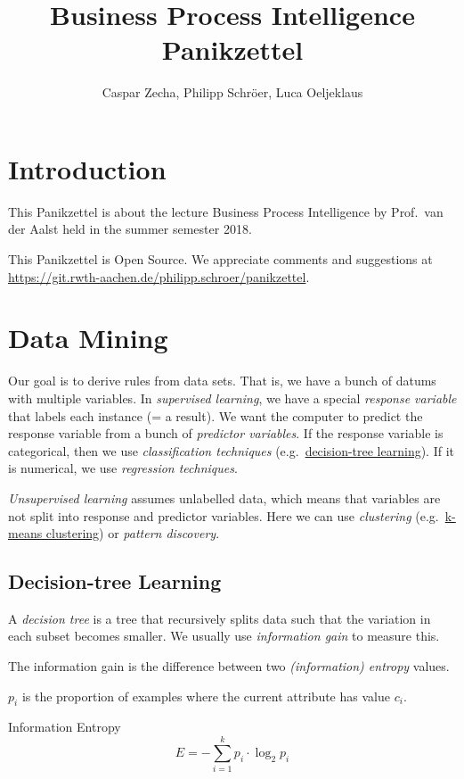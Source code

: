 \documentclass[english]{panikzettel}
\title{Business Process Intelligence Panikzettel}
\author{Caspar Zecha, Philipp Schröer, Luca Oeljeklaus}
\begin{document}
\maketitle

\tableofcontents

\section{Introduction}

This Panikzettel is about the lecture Business Process Intelligence by Prof.\ van der Aalst held in the summer semester 2018.

This Panikzettel is Open Source. We appreciate comments and suggestions at \\ \url{https://git.rwth-aachen.de/philipp.schroer/panikzettel}.

\section{Data Mining}

Our goal is to derive rules from data sets.
That is, we have a bunch of datums with multiple variables.
In \emph{supervised learning}, we have a special \emph{response variable} that labels each instance (= a result).
We want the computer to predict the response variable from a bunch of \emph{predictor variables}.
If the response variable is categorical, then we use \emph{classification techniques} (e.g.\ \hyperref[sec:decision-tree-learning]{decision-tree learning}). If it is numerical, we use \emph{regression techniques}.

\emph{Unsupervised learning} assumes unlabelled data, which means that variables are not split into response and predictor variables.
Here we can use \emph{clustering} (e.g.\ \hyperref[sec:clustering]{k-means clustering}) or \emph{pattern discovery}.

\subsection{Decision-tree Learning}
\label{sec:decision-tree-learning}

A \emph{decision tree} is a tree that recursively splits data such that the variation in each subset becomes smaller.
We usually use \emph{information gain} to measure this.

\begin{halfboxl}
The information gain is the difference between two \emph{(information) entropy} values.

$p_i$ is the proportion of examples where the current attribute has value $c_i$.
\end{halfboxl}%
\begin{halfboxr}
\vspace{-\baselineskip}
\begin{defi}{Information Entropy}
\[ E = - \sum_{i=1}^k p_i \cdot \log_2 p_i \]
\end{defi}
\end{halfboxr}
\end{document}
